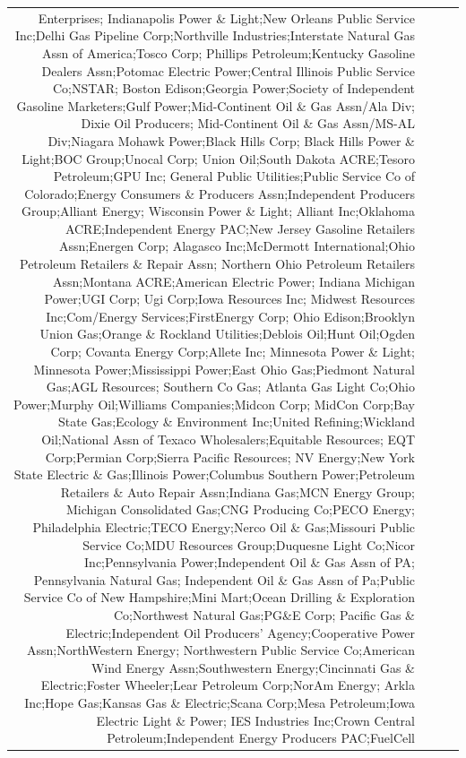 \documentclass[]{article}
\begin{document}
\begin{longtable}[]{@{}rlrl@{}}
Enterprises; Indianapolis Power \& Light;New Orleans Public Service
Inc;Delhi Gas Pipeline Corp;Northville Industries;Interstate Natural Gas
Assn of America;Tosco Corp; Phillips Petroleum;Kentucky Gasoline Dealers
Assn;Potomac Electric Power;Central Illinois Public Service Co;NSTAR;
Boston Edison;Georgia Power;Society of Independent Gasoline
Marketers;Gulf Power;Mid-Continent Oil \& Gas Assn/Ala Div; Dixie Oil
Producers; Mid-Continent Oil \& Gas Assn/MS-AL Div;Niagara Mohawk
Power;Black Hills Corp; Black Hills Power \& Light;BOC Group;Unocal
Corp; Union Oil;South Dakota ACRE;Tesoro Petroleum;GPU Inc; General
Public Utilities;Public Service Co of Colorado;Energy Consumers \&
Producers Assn;Independent Producers Group;Alliant Energy; Wisconsin
Power \& Light; Alliant Inc;Oklahoma ACRE;Independent Energy PAC;New
Jersey Gasoline Retailers Assn;Energen Corp; Alagasco Inc;McDermott
International;Ohio Petroleum Retailers \& Repair Assn; Northern Ohio
Petroleum Retailers Assn;Montana ACRE;American Electric Power; Indiana
Michigan Power;UGI Corp; Ugi Corp;Iowa Resources Inc; Midwest Resources
Inc;Com/Energy Services;FirstEnergy Corp; Ohio Edison;Brooklyn Union
Gas;Orange \& Rockland Utilities;Deblois Oil;Hunt Oil;Ogden Corp;
Covanta Energy Corp;Allete Inc; Minnesota Power \& Light; Minnesota
Power;Mississippi Power;East Ohio Gas;Piedmont Natural Gas;AGL
Resources; Southern Co Gas; Atlanta Gas Light Co;Ohio Power;Murphy
Oil;Williams Companies;Midcon Corp; MidCon Corp;Bay State Gas;Ecology \&
Environment Inc;United Refining;Wickland Oil;National Assn of Texaco
Wholesalers;Equitable Resources; EQT Corp;Permian Corp;Sierra Pacific
Resources; NV Energy;New York State Electric \& Gas;Illinois
Power;Columbus Southern Power;Petroleum Retailers \& Auto Repair
Assn;Indiana Gas;MCN Energy Group; Michigan Consolidated Gas;CNG
Producing Co;PECO Energy; Philadelphia Electric;TECO Energy;Nerco Oil \&
Gas;Missouri Public Service Co;MDU Resources Group;Duquesne Light
Co;Nicor Inc;Pennsylvania Power;Independent Oil \& Gas Assn of PA;
Pennsylvania Natural Gas; Independent Oil \& Gas Assn of Pa;Public
Service Co of New Hampshire;Mini Mart;Ocean Drilling \& Exploration
Co;Northwest Natural Gas;PG\&E Corp; Pacific Gas \& Electric;Independent
Oil Producers' Agency;Cooperative Power Assn;NorthWestern Energy;
Northwestern Public Service Co;American Wind Energy Assn;Southwestern
Energy;Cincinnati Gas \& Electric;Foster Wheeler;Lear Petroleum
Corp;NorAm Energy; Arkla Inc;Hope Gas;Kansas Gas \& Electric;Scana
Corp;Mesa Petroleum;Iowa Electric Light \& Power; IES Industries
Inc;Crown Central Petroleum;Independent Energy Producers PAC;FuelCell

\end{longtable}
\end{document}
